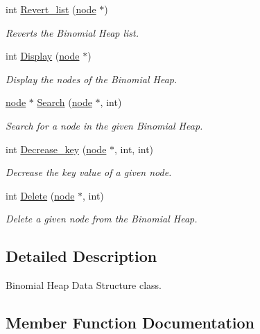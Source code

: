 \begin{DoxyCompactItemize}
\item 
int \hyperlink{classBinomialHeap_a59481a0ec3750711c68e9ddd21443707}{Revert\+\_\+list} (\hyperlink{structnode}{node} $\ast$)
\begin{DoxyCompactList}\small\item\em Reverts the Binomial Heap list. \end{DoxyCompactList}\item 
int \hyperlink{classBinomialHeap_a43b3339eb8cc6eea26f769ab616b720a}{Display} (\hyperlink{structnode}{node} $\ast$)
\begin{DoxyCompactList}\small\item\em Display the nodes of the Binomial Heap. \end{DoxyCompactList}\item 
\hyperlink{structnode}{node} $\ast$ \hyperlink{classBinomialHeap_a5066787434a932210311500f671d2202}{Search} (\hyperlink{structnode}{node} $\ast$, int)
\begin{DoxyCompactList}\small\item\em Search for a node in the given Binomial Heap. \end{DoxyCompactList}\item 
int \hyperlink{classBinomialHeap_a3898a1fb87677fdb94a40f62ac416de9}{Decrease\+\_\+key} (\hyperlink{structnode}{node} $\ast$, int, int)
\begin{DoxyCompactList}\small\item\em Decrease the key value of a given node. \end{DoxyCompactList}\item 
int \hyperlink{classBinomialHeap_aab7ea7e42fe1b2aaf3298f73f4e68884}{Delete} (\hyperlink{structnode}{node} $\ast$, int)
\begin{DoxyCompactList}\small\item\em Delete a given node from the Binomial Heap. \end{DoxyCompactList}\end{DoxyCompactItemize}


\subsection{Detailed Description}
Binomial Heap Data Structure class. 

\subsection{Member Function Documentation}
